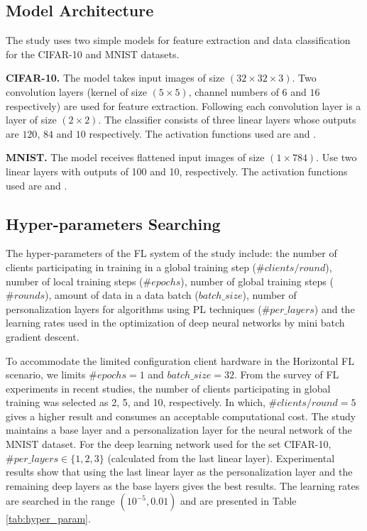 \documentclass[runningheads]{llncs}
\begin{document}
\subsection{Model Architecture}
\label{model_architecture}

The study uses two simple models for feature extraction and data classification for the CIFAR-10 and MNIST datasets.

\textbf{CIFAR-10.} The model takes input images of size $(32\times32\times3)$. Two convolution layers (kernel of size $(5\times5)$, channel numbers of $6$ and $16$ respectively) are used for feature extraction. Following each convolution layer is a  layer of size $(2\times2)$. The classifier consists of three linear layers whose outputs are $120$, $84$ and $10$ respectively. The activation functions used are  and .

\textbf{MNIST.} The model receives flattened input images of size $(1\times784)$. Use two linear layers with outputs of 100 and 10, respectively. The activation functions used are  and .

\subsection{Hyper-parameters Searching}

The hyper-parameters of the FL system of the study include: the number of clients participating in training in a global training step ($\#clients/round$), number of local training steps ($\#epochs $), number of global training steps ($\#rounds$), amount of data in a data batch ($batch\_size$), number of personalization layers for algorithms using PL techniques ($\# per\_layers$) and the learning rates used in the optimization of deep neural networks by mini batch gradient descent.

To accommodate the limited configuration client hardware in the Horizontal FL scenario, we limits $\#epochs=1$ and $batch\_size=32$. From the survey of FL experiments in recent studies, the number of clients participating in global training was selected as 2, 5, and 10, respectively. In which, $\#clients/round=5$ gives a higher result and consumes an acceptable computational cost. The study maintains a base layer and a personalization layer for the neural network of the MNIST dataset. For the deep learning network used for the set CIFAR-10, $\#per\_layers \in \{1,2,3\}$ (calculated from the last linear layer). Experimental results show that using the last linear layer as the personalization layer and the remaining deep layers as the base layers gives the best results. The learning rates are searched in the range $(10^{-5}, 0.01)$ and are presented in Table \ref{tab:hyper_param}.
\end{document}
